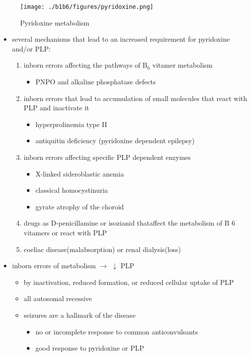 \documentclass{scrartcl}
\begin{document}
\begin{figure}[htbp]
\centering
\texttt{[image: ./b1b6/figures/pyridoxine.png]}
\caption{\label{fig:org90de64a}
Pyridoxine metabolism}
\end{figure}

\begin{itemize}
\item several mechanisms that lead to an increased requirement for
pyridoxine and/or PLP:
\begin{enumerate}
\item inborn errors affecting the pathways of B\(_{\text{6}}\) vitamer metabolism
\begin{itemize}
\item PNPO and alkaline phosphatase defects
\end{itemize}
\item inborn errors that lead to accumulation of small molecules that
react with PLP and inactivate it
\begin{itemize}
\item hyperprolinemia type II
\item antiquitin deficiency (pyridoxine dependent epilepsy)
\end{itemize}
\item inborn errors affecting specific PLP dependent enzymes
\begin{itemize}
\item X-linked sideroblastic anemia
\item classical homocystinuria
\item gyrate atrophy of the choroid
\end{itemize}
\item drugs as D-penicillamine or isozianid thataffect the metabolism of
B 6 vitamers or react with PLP
\item coeliac disease(malabsorption) or renal dialysis(loss)
\end{enumerate}
\item inborn errors of metabolism \(\to\) \(\downarrow\) PLP
\begin{itemize}
\item by inactivation, reduced formation, or reduced cellular uptake of PLP
\item all autosomal recessive
\item seizures are a hallmark of the disease
\begin{itemize}
\item no or incomplete response to common anticonvulsants
\item good response to pyridoxine or PLP
\end{itemize}
\end{itemize}
\end{itemize}
\end{document}
